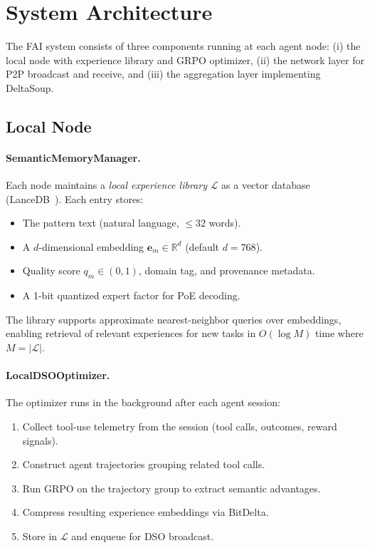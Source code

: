 \section{System Architecture}

\label{sec:architecture}

The FAI system consists of three components running at each agent node:
(i) the local node with experience library and GRPO optimizer,
(ii) the network layer for P2P broadcast and receive, and
(iii) the aggregation layer implementing DeltaSoup.

\subsection{Local Node}

\paragraph{SemanticMemoryManager.}
Each node maintains a \emph{local experience library} $\mathcal{L}$ as a
vector database (LanceDB~\cite{lancedb2024}). Each entry stores:
\begin{itemize}[leftmargin=1.5em]
    \item The pattern text (natural language, $\leq 32$ words).
    \item A $d$-dimensional embedding $\bm{e}_m \in \mathbb{R}^d$ (default $d = 768$).
    \item Quality score $q_m \in (0,1)$, domain tag, and provenance metadata.
    \item A 1-bit quantized expert factor for PoE decoding.
\end{itemize}
The library supports approximate nearest-neighbor queries over embeddings,
enabling retrieval of relevant experiences for new tasks in $O(\log M)$ time
where $M = |\mathcal{L}|$.

\paragraph{LocalDSOOptimizer.}
The optimizer runs in the background after each agent session:
\begin{enumerate}[leftmargin=1.5em]
    \item Collect tool-use telemetry from the session (tool calls, outcomes,
          reward signals).
    \item Construct agent trajectories grouping related tool calls.
    \item Run GRPO on the trajectory group to extract semantic advantages.
    \item Compress resulting experience embeddings via BitDelta.
    \item Store in $\mathcal{L}$ and enqueue for DSO broadcast.
\end{enumerate}

